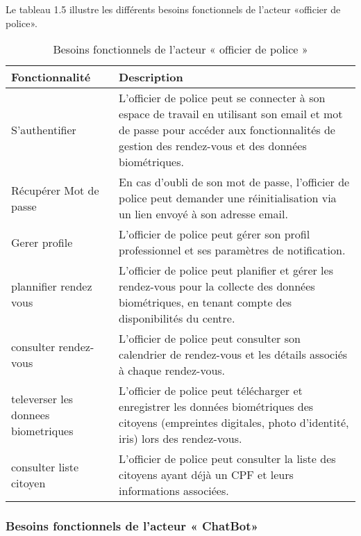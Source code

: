 Le tableau 1.5 illustre les différents besoins fonctionnels de l'acteur «officier de police».
\begin{table}[H]
\centering
\caption{\centering Besoins fonctionnels de l'acteur « officier de police »}

\begin{tabular}
{| >{\centering\arraybackslash}p{4.2cm} | >{\centering\arraybackslash}p{12.5cm} |}
\rowcolor{gray!30}
\hline \textbf{Fonctionnalité} & \textbf{Description}\\
\hline
S'authentifier & L'officier de police peut se connecter à son espace de travail en utilisant son email et mot de passe pour accéder aux fonctionnalités de gestion des rendez-vous et des données biométriques. \\
\hline
Récupérer Mot de passe & En cas d'oubli de son mot de passe, l'officier de police peut demander une réinitialisation via un lien envoyé à son adresse email.\\
\hline
Gerer profile & L'officier de police peut gérer son profil professionnel et ses paramètres de notification.\\
\hline
plannifier rendez vous & L'officier de police peut planifier et gérer les rendez-vous pour la collecte des données biométriques, en tenant compte des disponibilités du centre.\\
\hline
consulter rendez-vous & L'officier de police peut consulter son calendrier de rendez-vous et les détails associés à chaque rendez-vous.\\
\hline
televerser les donnees biometriques & L'officier de police peut télécharger et enregistrer les données biométriques des citoyens (empreintes digitales, photo d'identité, iris) lors des rendez-vous.\\
\hline
consulter liste citoyen & L'officier de police peut consulter la liste des citoyens ayant déjà un CPF et leurs informations associées.\\
\hline
\end{tabular}
\end{table}


\subsubsection{Besoins fonctionnels de l'acteur « ChatBot»}

